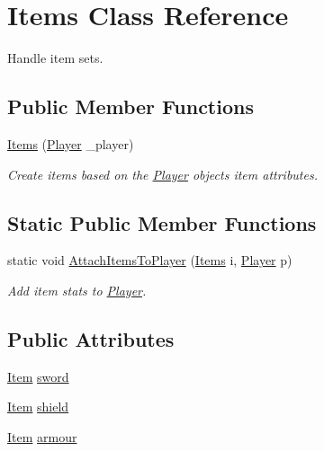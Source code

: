 \hypertarget{class_items}{}\section{Items Class Reference}
\label{class_items}


Handle item sets.  


\subsection*{Public Member Functions}
\begin{DoxyCompactItemize}
\item 
\mbox{\hyperlink{class_items_a78d62b542929857f6e65b3ed91fb31ee}{Items}} (\mbox{\hyperlink{class_player}{Player}} \+\_\+player)
\begin{DoxyCompactList}\small\item\em Create items based on the \mbox{\hyperlink{class_player}{Player}} object\textquotesingle{}s item attributes. \end{DoxyCompactList}\end{DoxyCompactItemize}
\subsection*{Static Public Member Functions}
\begin{DoxyCompactItemize}
\item 
static void \mbox{\hyperlink{class_items_a0fed8123fbaa68d1d310cdb28cb1793d}{Attach\+Items\+To\+Player}} (\mbox{\hyperlink{class_items}{Items}} i, \mbox{\hyperlink{class_player}{Player}} p)
\begin{DoxyCompactList}\small\item\em Add item stats to \mbox{\hyperlink{class_player}{Player}}. \end{DoxyCompactList}\end{DoxyCompactItemize}
\subsection*{Public Attributes}
\begin{DoxyCompactItemize}
\item 
\mbox{\hyperlink{class_item}{Item}} \mbox{\hyperlink{class_items_a2ee0fd7e676f594e6e184b56b7f1c958}{sword}}
\item 
\mbox{\hyperlink{class_item}{Item}} \mbox{\hyperlink{class_items_a7e6e791cf22f41a685dd2092105a81b1}{shield}}
\item 
\mbox{\hyperlink{class_item}{Item}} \mbox{\hyperlink{class_items_ad59621b7b465ccd957cf06dde55279dd}{armour}}
\end{DoxyCompactItemize}



